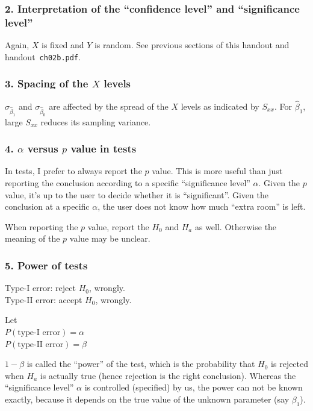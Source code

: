 \documentclass[12pt]{article}
\begin{document}
\subsubsection{2. Interpretation of the ``confidence level'' and
``significance level''}

Again, $X$ is fixed and $Y$ is random.
See previous sections of this handout and
handout~\texttt{ch02b.pdf}.

\subsubsection{3. Spacing of the $X$ levels}

$\sigma_{\hat{\beta}_1}$ and $\sigma_{\hat{\beta}_0}$ are affected by the spread of
the $X$ levels as indicated by $S_{xx}$.
For $\hat{\beta}_1$, large $S_{xx}$ reduces its sampling variance.

\subsubsection{4. $\alpha$ versus $p$ value in tests}

In tests, I prefer to always report the $p$ value.
This is more useful than just reporting the conclusion
according to a specific ``significance level'' $\alpha$.
Given the $p$ value, it's up to the user to decide whether it is
``significant''.
Given the conclusion at a specific $\alpha$,
the user does not know how much ``extra room'' is left.

When reporting the $p$ value, report the $H_0$ and $H_a$ as
well. Otherwise the meaning of the $p$ value may be unclear.

\subsubsection{5. Power of tests}

Type-I error: reject $H_0$, wrongly.\\
Type-II error: accept $H_0$, wrongly.

Let\\
$P(\text{type-I error}) = \alpha$\\
$P(\text{type-II error}) = \beta$

$1 - \beta$ is called the ``power'' of the test, which is
the probability that
$H_0$ is rejected when $H_a$ is actually true (hence
rejection is the right conclusion).
Whereas the ``significance level'' $\alpha$ is controlled (specified) by
us, the power can not be known exactly, because it depends on the true
value of the unknown parameter (say $\beta_1$).
\end{document}
